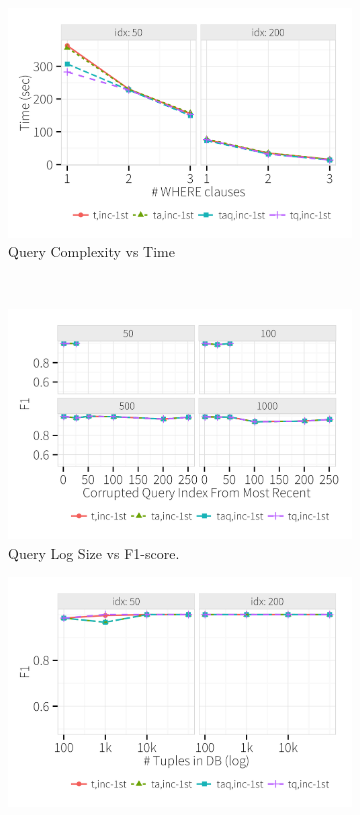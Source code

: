 \begin{figure}[h]
\begin{subfigure}[t]{.3\textwidth}
      \includegraphics[width = \columnwidth]{figures/where_time}
      \vspace*{-.1in}
      \caption{Query Complexity vs Time}
      \label{f:where_time} 
    \end{subfigure}
    \\
    \begin{subfigure}[t]{.3\textwidth}
      \includegraphics[width = .95\columnwidth]{figures/logsize_acc}
      \vspace*{-.1in}
      \caption{Query Log Size vs F1-score.}
      \label{f:logsize_acc} 
    \end{subfigure}
    \begin{subfigure}[t]{.3\textwidth}
      \includegraphics[width = .95\columnwidth]{figures/dbsize_acc}

\end{subfigure}
\end{figure}
